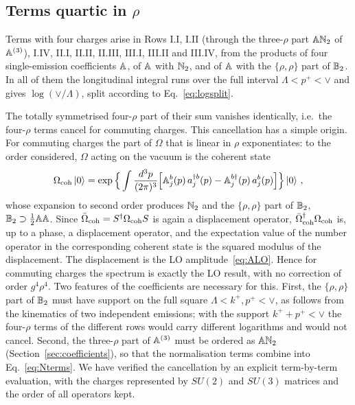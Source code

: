 \subsection{Terms quartic in \texorpdfstring{$\rho$}{rho}}\label{sec:fourrho}

Terms with four charges arise in Rows I.I, I.II (through the three-$\rho$ part $\mathbb{A}\mathbb{N}_2$ of $\mathbb{A}^{(3)}$), I.IV, II.I, II.II, II.III, III.I, III.II and III.IV, from the products of four single-emission coefficients $\mathbb{A}$, of $\mathbb{A}$ with $\mathbb{N}_2$, and of $\mathbb{A}$ with the $\{\rho,\rho\}$ part of $\mathbb{B}_2$. In all of them the longitudinal integral runs over the full interval $\Lambda<p^+<\vee$ and gives $\log(\vee/\Lambda)$, split according to Eq.~\eqref{eq:logsplit}.

The totally symmetrised four-$\rho$ part of their sum vanishes identically, i.e.\ the four-$\rho$ terms cancel for commuting charges. This cancellation has a simple origin. For commuting charges the part of $\Omega$ that is linear in $\rho$ exponentiates: to the order considered, $\Omega$ acting on the vacuum is the coherent state
\begin{align}\label{eq:coherent}
\Omega_{\rm coh}\ket0=\exp\Big\{\int\frac{d^3p}{(2\pi)^3}\Big[\mathbb{A}^b_j(p)\,a^{\dagger b}_j(p)-\mathbb{A}^{b\dagger}_j(p)\,a^b_j(p)\Big]\Big\}\ket0\,,
\end{align}
whose expansion to second order produces $\mathbb{N}_2$ and the $\{\rho,\rho\}$ part of $\mathbb{B}_2$, $\mathbb{B}_2\supset\frac12\mathbb{A}\mathbb{A}$. Since $\bar\Omega_{\rm coh}=S^\dagger\Omega_{\rm coh}S$ is again a displacement operator, $\bar\Omega^\dagger_{\rm coh}\Omega_{\rm coh}$ is, up to a phase, a displacement operator, and the expectation value of the number operator in the corresponding coherent state is the squared modulus of the displacement. The displacement is the LO amplitude~\eqref{eq:ALO}. Hence for commuting charges the spectrum is exactly the LO result, with no correction of order $g^4\rho^4$. Two features of the coefficients are necessary for this. First, the $\{\rho,\rho\}$ part of $\mathbb{B}_2$ must have support on the full square $\Lambda<k^+,p^+<\vee$, as follows from the kinematics of two independent emissions; with the support $k^++p^+<\vee$ the four-$\rho$ terms of the different rows would carry different logarithms and would not cancel. Second, the three-$\rho$ part of $\mathbb{A}^{(3)}$ must be ordered as $\mathbb{A}\mathbb{N}_2$ (Section~\ref{sec:coefficients}), so that the normalisation terms combine into Eq.~\eqref{eq:Nterms}. We have verified the cancellation by an explicit term-by-term evaluation, with the charges represented by $SU(2)$ and $SU(3)$ matrices and the order of all operators kept.

